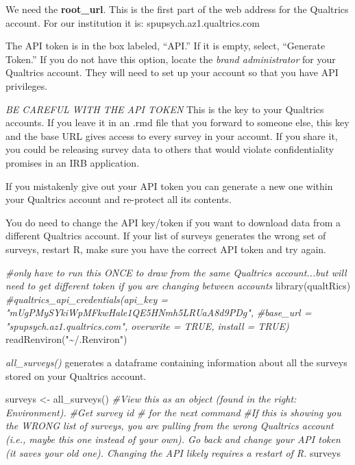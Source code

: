 \documentclass[
]{book}
\newenvironment{Shaded}{\begin{snugshade}}{\end{snugshade}}
\newcommand{\CommentTok}[1]{\textcolor[rgb]{0.56,0.35,0.01}{\textit{#1}}}
\newcommand{\FunctionTok}[1]{\textcolor[rgb]{0.00,0.00,0.00}{#1}}
\newcommand{\NormalTok}[1]{#1}
\newcommand{\OtherTok}[1]{\textcolor[rgb]{0.56,0.35,0.01}{#1}}
\newcommand{\StringTok}[1]{\textcolor[rgb]{0.31,0.60,0.02}{#1}}
\begin{document}
We need the \textbf{root\_url}. This is the first part of the web address for the Qualtrics account. For our institution it is: spupsych.az1.qualtrics.com

The API token is in the box labeled, ``API.'' If it is empty, select, ``Generate Token.'' If you do not have this option, locate the \emph{brand administrator} for your Qualtrics account. They will need to set up your account so that you have API privileges.

\emph{BE CAREFUL WITH THE API TOKEN} This is the key to your Qualtrics accounts. If you leave it in an .rmd file that you forward to someone else, this key and the base URL gives access to every survey in your account. If you share it, you could be releasing survey data to others that would violate confidentiality promises in an IRB application.

If you mistakenly give out your API token you can generate a new one within your Qualtrics account and re-protect all its contents.

You do need to change the API key/token if you want to download data from a different Qualtrics account. If your list of surveys generates the wrong set of surveys, restart R, make sure you have the correct API token and try again.

\begin{Shaded}
\begin{Highlighting}[]
\CommentTok{\#only have to run this ONCE to draw from the same Qualtrics account...but will need to get different token if you are changing between accounts }
\FunctionTok{library}\NormalTok{(qualtRics)}
\CommentTok{\#qualtrics\_api\_credentials(api\_key = "mUgPMySYkiWpMFkwHale1QE5HNmh5LRUaA8d9PDg",}
              \CommentTok{\#base\_url = "spupsych.az1.qualtrics.com", overwrite = TRUE, install = TRUE)}
\FunctionTok{readRenviron}\NormalTok{(}\StringTok{"\textasciitilde{}/.Renviron"}\NormalTok{)}
\end{Highlighting}
\end{Shaded}

\emph{all\_surveys()} generates a dataframe containing information about all the surveys stored on your Qualtrics account.

\begin{Shaded}
\begin{Highlighting}[]
\NormalTok{surveys }\OtherTok{\textless{}{-}} \FunctionTok{all\_surveys}\NormalTok{() }
\CommentTok{\#View this as an object (found in the right: Environment).  }
\CommentTok{\#Get survey id \# for the next command}
\CommentTok{\#If this is showing you the WRONG list of surveys, you are pulling from the wrong Qualtrics account (i.e., maybe this one instead of your own). Go back and change your API token (it saves your old one). Changing the API likely requires a restart of R.}
\NormalTok{surveys}
\end{Highlighting}
\end{Shaded}
\end{document}
